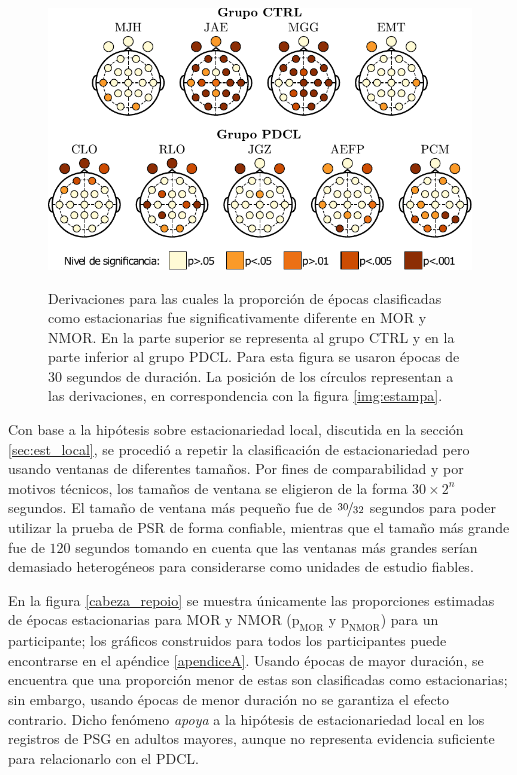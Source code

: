 \documentclass[12pt,letterpaper]{book}
\begin{document}
\begin{figure}
\centering
\includegraphics[width=.9\textwidth]{./img_art_dfa/prop_tabla.pdf} \\
\caption{Derivaciones para las cuales la proporción de épocas clasificadas como estacionarias fue significativamente diferente en MOR y NMOR.
%
En la parte superior se representa al grupo CTRL y en la parte inferior al grupo PDCL.
%
Para esta figura se usaron épocas de 30 segundos de duración.
%
La posición de los círculos representan a las derivaciones, en correspondencia con la figura \ref{img:estampa}.}
\label{cabeza_new}
\end{figure}

Con base a la hipótesis sobre estacionariedad local, discutida en la sección \ref{sec:est_local}, se procedió a repetir la clasificación de estacionariedad pero usando ventanas de diferentes tamaños.
%
Por fines de comparabilidad y por motivos técnicos, los tamaños de ventana se eligieron de la forma $30 \times 2^{n}$ segundos.
%
El tamaño de ventana más pequeño fue de $\nicefrac{30}{32}$ segundos para poder utilizar la prueba de PSR de forma confiable, mientras que el tamaño más grande fue de $120$ segundos tomando en cuenta que las ventanas más grandes serían demasiado heterogéneos para considerarse como unidades de estudio fiables.

En la figura \ref{cabeza_repoio} se muestra únicamente las proporciones estimadas de épocas estacionarias para MOR y NMOR ($\text{p}_{\text{MOR}}$ y $\text{p}_{\text{NMOR}}$) para un participante; los gráficos construidos para todos los participantes puede encontrarse en el apéndice \ref{apendiceA}.
%
Usando épocas de mayor duración, se encuentra que una proporción menor de estas son clasificadas como estacionarias; sin embargo, usando épocas de menor duración no se garantiza el efecto contrario.
%
Dicho fenómeno \textit{apoya} a la hipótesis de estacionariedad local en los registros de PSG en adultos mayores, aunque no representa evidencia suficiente para relacionarlo con el PDCL.
\end{document}
